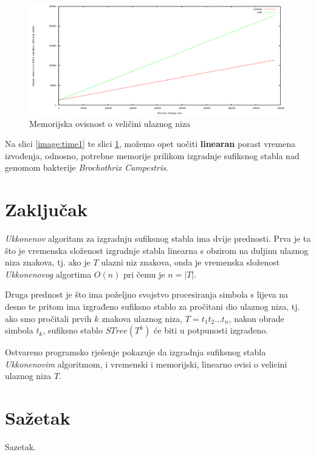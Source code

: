\documentclass[times, utf8, seminar, numeric]{fer}
\begin{document}
\begin{figure}[h!]	
	\centering
	\includegraphics[width=1\textwidth]{media/memory_2.png}
	\caption{Memorijska ovisnost o veličini ulaznog niza}
	\label{image:memory1}
\end{figure}

\pagebreak

Na slici \ref{image:time1} te slici \ref{image:memory1}, možemo opet uočiti \textbf{linearan} porast vremena izvođenja, odnosno, potrebne memorije prilikom izgradnje sufiksnog stabla nad genomom bakterije \textit{Brochothrix Campestris}.

\chapter{Zaključak}
	\textit{Ukkonenov} algoritam za izgradnju sufiksnog stabla ima dvije prednosti. Prva je ta što je vremenska složenost izgradnje stabla linearna s obzirom na duljinu ulaznog niza znakova, tj. ako je $T$ ulazni niz znakova, onda je vremenska složenost \textit{Ukkonenovog} algortima $O(n)$ pri čemu je $n = |T|$.
	
	Druga prednost je što ima poželjno svojstvo procesiranja simbola s lijeva na desno te pritom ima izgrađeno sufiksno stablo za pročitani dio ulaznog niza, tj. ako smo pročitali prvih $k$ znakova ulaznog niza, $T = t_1 t_2 ... t_n$, nakon obrade simbola $t_k$, sufiksno stablo $STree(T^k)$ će biti u potpunosti izgrađeno.

 	Ostvareno programsko rješenje pokazuje da izgradnja sufiksnog stabla \textit{Ukkonenovim} algoritmom, i vremenski i memorijski, linearno ovisi o velicini ulaznog niza $T$. 




\chapter{Sažetak}
Sazetak.
\end{document}
